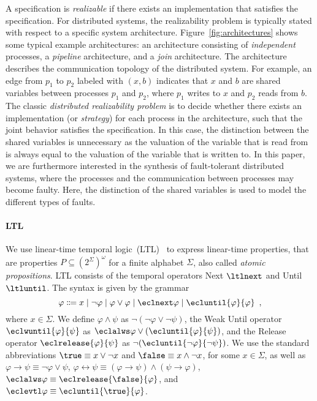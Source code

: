 \documentclass{LMCS}
\theoremstyle{plain}\newtheorem{theorem}[thm]{Theorem}
\theoremstyle{plain}\newtheorem{lemma}[thm]{Lemma}
\theoremstyle{plain}\newtheorem{proposition}[thm]{Proposition}
\theoremstyle{plain}\newtheorem{corollary}[thm]{Corollary}
\theoremstyle{definition}\newtheorem{definition}{Definition}[section]
\begin{document}
A specification is \emph{realizable} if there exists an implementation that satisfies the specification. 
For distributed systems, the realizability problem is typically stated with respect to 
a specific system architecture. Figure~\ref{fig:architectures} shows some typical example architectures: an architecture consisting of \emph{independent} processes, a \emph{pipeline} architecture, and a \emph{join} architecture. The architecture describes the communication topology of the distributed system. For example, an edge from $p_1$ to $p_2$ labeled with $(x,b)$ indicates that $x$ and $b$ are shared variables between processes $p_1$ and $p_2$, where $p_1$ writes to $x$ and $p_2$ reads from $b$.
The classic \emph{distributed realizability problem} is to decide whether there exists an implementation (or \emph{strategy}) for each process in the architecture, such that the joint behavior satisfies the specification.
In this case, the distinction between the shared variables is unnecessary as the valuation of the variable that is read from is always equal to the valuation of the variable that is written to.
In this paper, we are furthermore interested in the synthesis of fault-tolerant distributed systems, where the processes and the communication between processes may become faulty.
Here, the distinction of the shared variables is used to model the different types of faults.

\paragraph{\bf LTL} \label{sec:ltl}
We use linear-time temporal logic~(LTL)~\cite{DBLP:conf/focs/Pnueli77} to express linear-time properties, that are properties $P \subseteq (2^\Sigma)^\omega$ for a finite alphabet $\Sigma$, also called \emph{atomic propositions}.
LTL consists of the temporal operators Next $\ltlnext$ and Until $\ltluntil$.
The syntax is given by the grammar
\begin{equation*} \label{eq:ltl_syntax}
\varphi \Coloneqq x \mid \neg \varphi \mid \varphi \lor \varphi \mid \eclnext \varphi \mid \ecluntil{\varphi}{\varphi} \enspace,
\end{equation*}
where $x \in \Sigma$.
We define $\varphi \land \psi$ as $\neg(\neg\varphi \lor \neg\psi)$, the Weak Until operator $\eclwuntil{\varphi}{\psi}$ as $\eclalws \varphi \lor (\ecluntil{\varphi}{\psi})$, and the Release operator $\eclrelease{\varphi}{\psi}$ as $\neg(\ecluntil{\neg\varphi}{\neg\psi})$.
We use the standard abbreviations $\true \equiv x \lor \neg x$ and $\false \equiv x \land \neg x$, for some $x \in \Sigma$, as well as $\varphi \rightarrow \psi \equiv \neg\varphi \lor \psi$, $\varphi \leftrightarrow \psi \equiv (\varphi \rightarrow \psi) \land (\psi \rightarrow \varphi)$, $\eclalws \varphi \equiv \eclrelease{\false}{\varphi}$, and $\eclevtl \varphi \equiv \ecluntil{\true}{\varphi}$.
\end{document}
